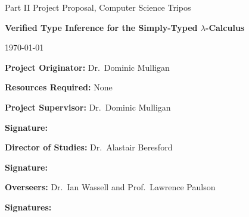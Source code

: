 \begin{titlepage}

\medskip
{}
\medskip
{}

\vfil

\centerline{\large Part II Project Proposal, Computer Science Tripos}
\vspace{0.4in}
\centerline{\Large\bf Verified Type Inference for the Simply-Typed $\lambda$-Calculus}
\vspace{0.3in}
\centerline{\large \today}

\vfil

{\bf Project Originator:} Dr.~Dominic Mulligan

\vspace{0.1in}

{\bf Resources Required:} None

\vspace{0.5in}

{\bf Project Supervisor:} Dr.~Dominic Mulligan

\vspace{0.2in}

{\bf Signature:}

\vspace{0.5in}

{\bf Director of Studies:} Dr.~Alastair Beresford

\vspace{0.2in}

{\bf Signature:}

\vspace{0.5in}

{\bf Overseers:} Dr.~Ian Wassell and Prof.~Lawrence Paulson

\vspace{0.2in}

{\bf Signatures:}

\vfil
\end{titlepage}
